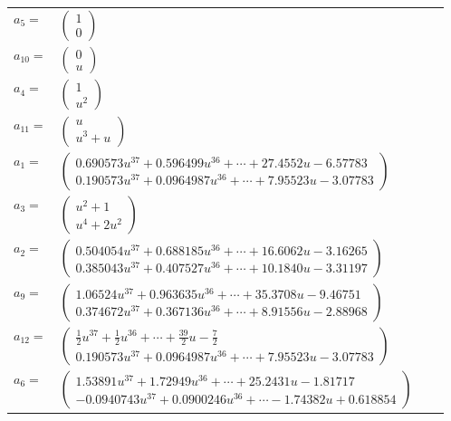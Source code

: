 \documentclass[1p]{elsarticle_modified}
\theoremstyle{definition}
\begin{document}
\begin{tabular}{m{7pt} m{180pt} m{7pt} m{180pt} }
\flushright $a_{5}=$&$\begin{pmatrix}1\\0\end{pmatrix}$ \\
\flushright $a_{10}=$&$\begin{pmatrix}0\\u\end{pmatrix}$ \\
\flushright $a_{4}=$&$\begin{pmatrix}1\\u^2\end{pmatrix}$ \\
\flushright $a_{11}=$&$\begin{pmatrix}u\\u^3+u\end{pmatrix}$ \\
\flushright $a_{1}=$&$\begin{pmatrix}0.690573 u^{37}+0.596499 u^{36}+\cdots+27.4552 u-6.57783\\0.190573 u^{37}+0.0964987 u^{36}+\cdots+7.95523 u-3.07783\end{pmatrix}$ \\
\flushright $a_{3}=$&$\begin{pmatrix}u^2+1\\u^4+2 u^2\end{pmatrix}$ \\
\flushright $a_{2}=$&$\begin{pmatrix}0.504054 u^{37}+0.688185 u^{36}+\cdots+16.6062 u-3.16265\\0.385043 u^{37}+0.407527 u^{36}+\cdots+10.1840 u-3.31197\end{pmatrix}$ \\
\flushright $a_{9}=$&$\begin{pmatrix}1.06524 u^{37}+0.963635 u^{36}+\cdots+35.3708 u-9.46751\\0.374672 u^{37}+0.367136 u^{36}+\cdots+8.91556 u-2.88968\end{pmatrix}$ \\
\flushright $a_{12}=$&$\begin{pmatrix}\frac{1}{2} u^{37}+\frac{1}{2} u^{36}+\cdots+\frac{39}{2} u-\frac{7}{2}\\0.190573 u^{37}+0.0964987 u^{36}+\cdots+7.95523 u-3.07783\end{pmatrix}$ \\
\flushright $a_{6}=$&$\begin{pmatrix}1.53891 u^{37}+1.72949 u^{36}+\cdots+25.2431 u-1.81717\\-0.0940743 u^{37}+0.0900246 u^{36}+\cdots-1.74382 u+0.618854\end{pmatrix}$ \\

\end{tabular}
\end{document}
